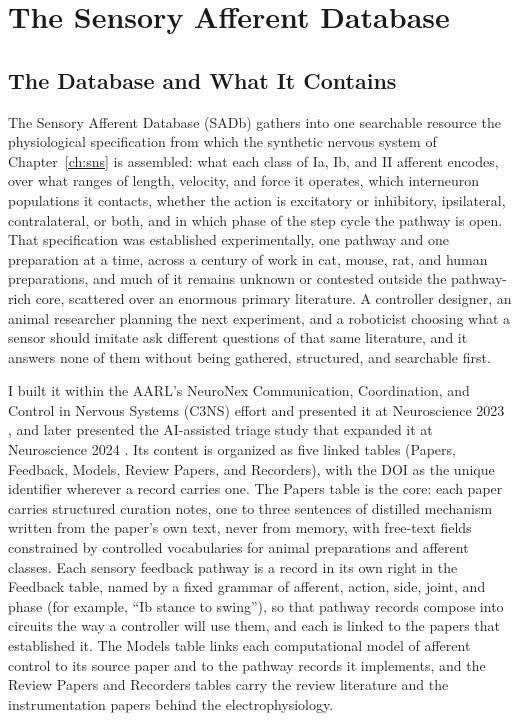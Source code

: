 ﻿\chapter{The Sensory Afferent Database}\label{ch:database}
\graphicspath{{../Figures/50-database/}{figs/50-database/}}

\section{The Database and What It Contains}\label{sec:sadb_resource}

The Sensory Afferent Database (SADb) gathers into one searchable resource the physiological specification from which the synthetic nervous system of Chapter~\ref{ch:sns} is assembled: what each class of Ia, Ib, and II afferent encodes, over what ranges of length, velocity, and force it operates, which interneuron populations it contacts, whether the action is excitatory or inhibitory, ipsilateral, contralateral, or both, and in which phase of the step cycle the pathway is open. That specification was established experimentally, one pathway and one preparation at a time, across a century of work in cat, mouse, rat, and human preparations, and much of it remains unknown or contested outside the pathway-rich core, scattered over an enormous primary literature. A controller designer, an animal researcher planning the next experiment, and a roboticist choosing what a sensor should imitate ask different questions of that same literature, and it answers none of them without being gathered, structured, and searchable first.

I built it within the AARL's NeuroNex Communication, Coordination, and Control in Nervous Systems (C3NS) effort and presented it at Neuroscience 2023 \citep{bolen_sensory_2023}, and later presented the AI-assisted triage study that expanded it at Neuroscience 2024 \citep{bolen_using_2024}. Its content is organized as five linked tables (Papers, Feedback, Models, Review Papers, and Recorders), with the DOI as the unique identifier wherever a record carries one. The Papers table is the core: each paper carries structured curation notes, one to three sentences of distilled mechanism written from the paper's own text, never from memory, with free-text fields constrained by controlled vocabularies for animal preparations and afferent classes. Each sensory feedback pathway is a record in its own right in the Feedback table, named by a fixed grammar of afferent, action, side, joint, and phase (for example, ``Ib stance to swing''), so that pathway records compose into circuits the way a controller will use them, and each is linked to the papers that established it. The Models table links each computational model of afferent control to its source paper and to the pathway records it implements, and the Review Papers and Recorders tables carry the review literature and the instrumentation papers behind the electrophysiology.

